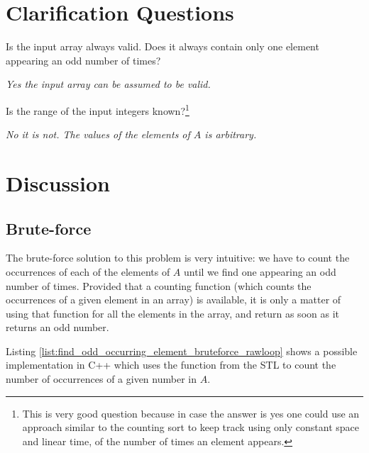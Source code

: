 \section{Clarification Questions}

\begin{QandA}
	\item Is the input array always valid. Does it always contain only one element appearing an odd number of times?
	\begin{answered}
		\textit{Yes the input array can be assumed to be valid.}
	\end{answered}
	\item  Is the range of the input integers known?\footnote{This is very good question because in case the answer is yes one could use an approach similar to the counting sort to keep track using only constant space and linear time, of the number of times an element appears.}
	\begin{answered}
		\textit{No it is not. The values of the elements of $A$ is arbitrary.}
	\end{answered}
	
\end{QandA}

\section{Discussion}

\subsection{Brute-force}
\label{find_odd_occurring_element:sec:bruteforce}

The brute-force solution to this problem is very intuitive: we have to count the occurrences of each of the elements of $A$ until we find one appearing an odd number of times.  
Provided that a counting function (which counts the occurrences of a given element in an array) is available, it is only a matter of using that function for all the elements in the array, and return as soon as it returns an odd number. 

Listing \ref{list:find_odd_occurring_element_bruteforce_rawloop} shows a possible implementation in C++ which uses the  function from the STL to count the number of occurrences of a given number in $A$.




